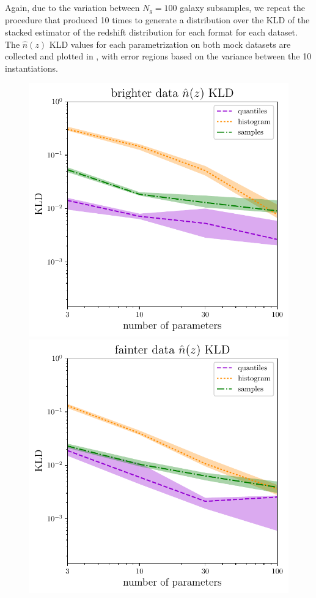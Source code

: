 Again, due to the variation between $N_{g}=100$ galaxy subsamples, we repeat 
the procedure that produced  10 times to generate a 
distribution over the KLD of the stacked estimator of the redshift distribution 
for each format for each dataset.
The $\hat{n}(z)$ KLD values for each parametrization on both mock datasets are 
collected and plotted in , with error regions based on the 
variance between the 10 instantiations.
\begin{figure}
	\begin{center}
		\includegraphics[width=\columnwidth]{figures/qp/graham_nz_kld.pdf}    
		\includegraphics[width=\columnwidth]{figures/qp/schmidt_nz_kld.pdf}

\end{center}
\end{figure}
